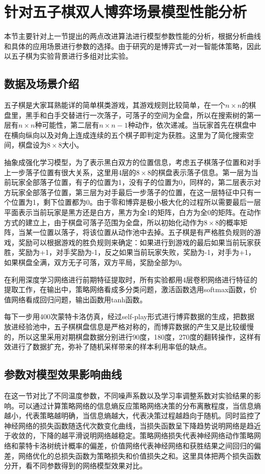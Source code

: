 \section{针对五子棋双人博弈场景模型性能分析}

本节主要针对上一节提出的两点改进算法进行模型参数性能的分析，根据分析曲线和具体的应用场景进行参数的选择。由于研究的是博弈式一对一智能体策略，因此以五子棋为实验背景进行多组对比实验。

\subsection{数据及场景介绍}
五子棋是大家耳熟能详的简单棋类游戏，其游戏规则比较简单，在一个$n \times n$的棋盘里，黑手和白手交替进行一次落子，可落子的空间为全盘，所以在搜索树的第一层有$n \times n$种可能性，第二层有$n \times n-1$种动作，依次递减。当玩家首先在棋盘中在横向纵向以及对角上连成连续的五个棋子即判定为获胜。这里为了简化搜索空间，棋盘设为$8 \times 8$大小。

抽象成强化学习模型，为了表示黑白双方的位置信息，考虑五子棋落子位置和对手上一步落子位置有很大关系，这里用4层的$8 \times 8$的棋盘表示落子信息。第一层为当前玩家全部落子位置，有子的位置为1，没有子的位置为0，同样的，第二层表示对方玩家全部落子位置，第三层为对手最后一步落子的位置，在这一层特征中只有一个位置为1，剩下位置都为0。由于零和博弈是极小极大化的过程所以需要最后一层平面表示当前玩家是黑方还是白方，黑方为全1的矩阵，白方为全0的矩阵。在动作方式的建立上，由于棋盘可落子范围为全盘，所以初始化动作为$8 \times 8$的概率矩阵，当某一位置以落子，将该位置从动作池中去掉。五子棋是有严格胜负规则的游戏，奖励可以根据游戏的胜负规则来确定：如果进行到游戏的最后如果当前玩家获胜，奖励为+1，对手奖励为-1，反之如果当前玩家失败，奖励为-1，对手为+1，如果棋盘全满，双方无子可落，双方平局，奖励全部为0。

在利用深度学习网络进行前期特征提取时，所有实验都用4层卷积网络进行特征的提取工作，在输出中，策略网络看成多分类问题，激活函数选用softmax函数，价值网络看成回归问题，输出函数用tanh函数。

每下一步用400次蒙特卡洛仿真，经过self-play形式进行博弈数据的生成，把数据放进经验池中，五子棋棋盘信息是严格对称的，而博弈数据的产生又是比较缓慢的，所以这里采用对期棋盘数据分别进行90度，180度，270度的翻转操作，这样有效进行了数据扩充，弥补了随机采样带来的样本利用率低的缺点。

\subsection{参数对模型效果影响曲线}
在这一节对比了不同温度参数，不同噪声系数以及学习率调整系数对实验结果的影响。可以通过计算策略网络的信息熵反应策略网络决策的分布离散程度，当信息熵越小，代表策略越明确，当信息熵越大，代表决策过程越趋向于随机。同时监控了神经网络的损失函数随迭代次数变化曲线，当损失函数呈下降趋势说明网络是趋近于收敛的，下降的越平滑说明网络越稳定。策略网络损失代表神经网络动作策略网络和蒙特卡洛树统计概率的偏差，价值网络代表神经网络和获胜结果之间回归的偏差，网络优化的总损失函数为策略损失和价值损失之和。这里具体把两个损失函数分开，看不同参数得到的网络模型效果对比。

